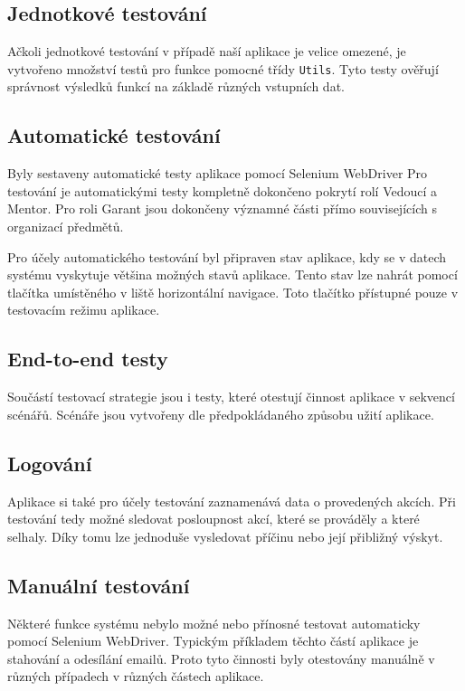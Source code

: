 \documentclass[czech,BP]{thesiskiv}
\begin{document}
	\subsection{Jednotkové testování}
	\par Ačkoli jednotkové testování v případě naší aplikace je velice omezené, je vytvořeno množství testů pro funkce pomocné třídy \texttt{Utils}. Tyto testy ověřují správnost výsledků funkcí na základě různých vstupních dat.
	\subsection{Automatické testování}
	\par Byly sestaveny automatické testy aplikace pomocí Selenium WebDriver Pro testování je automatickými testy kompletně dokončeno pokrytí rolí Vedoucí a Mentor. Pro roli Garant jsou dokončeny významné části přímo souvisejících s organizací předmětů.
	\par Pro účely automatického testování byl připraven stav aplikace, kdy se v datech systému vyskytuje většina možných stavů aplikace. Tento stav lze nahrát pomocí tlačítka  umístěného v liště horizontální navigace. Toto tlačítko přístupné pouze v testovacím režimu aplikace.
	\subsection{End-to-end testy}
	\par Součástí testovací strategie jsou i testy, které otestují činnost aplikace v sekvencí scénářů. Scénáře jsou vytvořeny dle předpokládaného způsobu užití aplikace.
	\subsection{Logování}
	\par Aplikace si také pro účely testování zaznamenává data o provedených akcích. Při testování tedy možné sledovat posloupnost akcí, které se prováděly a které selhaly. Díky tomu lze jednoduše vysledovat příčinu nebo její přibližný výskyt.
	\subsection{Manuální testování}
	\par Některé funkce systému nebylo možné nebo přínosné testovat automaticky pomocí Selenium WebDriver. Typickým příkladem těchto částí aplikace je stahování a odesílání emailů. Proto tyto činnosti byly otestovány manuálně v různých případech v různých částech aplikace.
\end{document}
